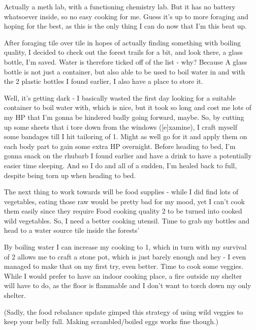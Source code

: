 \documentclass[11pt]{report}
\begin{document}
Actually a meth lab, with a functioning chemistry lab. But it has no battery whatsoever inside, so no easy cooking for me. Guess it's up to more foraging and hoping for the best, as this is the only thing I can do now that I'm this beat up.

After foraging tile over tile in hopes of actually finding something with boiling quality, I decided to check out the forest trails for a bit, and look there, a glass bottle, I'm saved. Water is therefore ticked off of the list - why? Because A glass bottle is not just a container, but also able to be used to boil water in and with the 2 plastic bottles I found earlier, I also have a place to store it.

Well, it's getting dark - I basically wasted the first day looking for a suitable container to boil water with, which is nice, but it took so long and cost me lots of my HP that I'm gonna be hindered badly going forward, maybe. So, by cutting up some sheets that i tore down from the windows ([e]xamine), I craft myself some bandages till I hit tailoring of 1. Might as well go for it and apply them on each body part to gain some extra HP overnight. Before heading to bed, I'm gonna snack on the rhubarb I found earlier and have a drink to have a potentially easier time sleeping. And so I do and all of a sudden, I'm healed back to full, despite being torn up when heading to bed.

The next thing to work towards will be food supplies - while I did find lots of vegetables, eating those raw would be pretty bad for my mood, yet I can't cook them easily since they require Food cooking quality 2 to be turned into cooked wild vegetables. So, I need a better cooking utensil. Time to grab my bottles and head to a water source tile inside the forests'

By boiling water I can increase my cooking to 1, which in turn with my survival of 2 allows me to craft a stone pot, which is just barely enough and hey - I even managed to make that on my first try, even better. Time to cook some veggies. While I would prefer to have an indoor cooking place, a fire outside my shelter will have to do, as the floor is flammable and I don't want to torch down my only shelter.

(Sadly, the food rebalance update gimped this strategy of using wild veggies to keep your belly full. Making scrambled/boiled eggs works fine though.)
\end{document}
